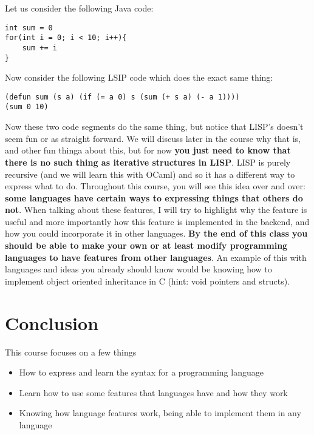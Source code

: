 \documentclass[main.tex]{subfiles}
\begin{document}
Let us consider the following Java code:
\begin{verbatim}
int sum = 0
for(int i = 0; i < 10; i++){
    sum += i
}
\end{verbatim}
Now consider the following LSIP code which does the exact same thing:
\begin{verbatim}
(defun sum (s a) (if (= a 0) s (sum (+ s a) (- a 1))))
(sum 0 10)
\end{verbatim}
Now these two code segments do the same thing, but notice that LISP's doesn't seem fun or as straight forward. We will discuss later in the course why that is, and other fun thinga about this, but for now \textbf{you just need to know that there is no such thing as iterative structures in LISP}. LISP is purely recursive (and we will learn this with OCaml) and so it has a different way to express what to do. Throughout this course, you will see this idea over and over: \textbf{some languages have certain ways to expressing things that others do not}. When talking about these features, I will try to highlight why the feature is useful and more importantly how this feature is implemented in the backend, and how you could incorporate it in other languages. \textbf{By the end of this class you should be able to make your own or at least modify programming languages to have features from other languages}. An example of this with languages and ideas you already should know would be knowing how to implement object oriented inheritance in C (hint: void pointers and structs).

\section{Conclusion}
This course focuses on a few things
\begin{center}
    \begin{itemize}
    \item How to express and learn the syntax for a programming language
    \item Learn how to use some features that languages have and how they work
    \item Knowing how language features work, being able to implement them in any language
    \end{itemize}
\end{center}
\end{document}
